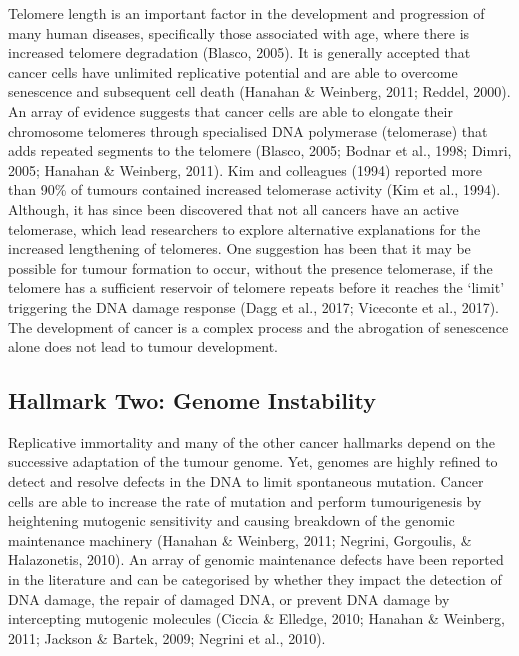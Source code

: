 \documentclass[a4paper, twoside]{templates/ociamthesis}
\begin{document}
Telomere length is an important factor in the development and progression of many human diseases, specifically those associated with age, where there is increased telomere degradation (Blasco, 2005). It is generally accepted that cancer cells have unlimited replicative potential and are able to overcome senescence and subsequent cell death (Hanahan \& Weinberg, 2011; Reddel, 2000). An array of evidence suggests that cancer cells are able to elongate their chromosome telomeres through specialised DNA polymerase (telomerase) that adds repeated segments to the telomere (Blasco, 2005; Bodnar et al., 1998; Dimri, 2005; Hanahan \& Weinberg, 2011). Kim and colleagues (1994) reported more than 90\% of tumours contained increased telomerase activity (Kim et al., 1994).
Although, it has since been discovered that not all cancers have an active telomerase, which lead researchers to explore alternative explanations for the increased lengthening of telomeres. One suggestion has been that it may be possible for tumour formation to occur, without the presence telomerase, if the telomere has a sufficient reservoir of telomere repeats before it reaches the `limit' triggering the DNA damage response (Dagg et al., 2017; Viceconte et al., 2017). The development of cancer is a complex process and the abrogation of senescence alone does not lead to tumour development.

\hypertarget{hallmark-two-genome-instability}{%
\subsection{Hallmark Two: Genome Instability}\label{hallmark-two-genome-instability}}

Replicative immortality and many of the other cancer hallmarks depend on the successive adaptation of the tumour genome. Yet, genomes are highly refined to detect and resolve defects in the DNA to limit spontaneous mutation. Cancer cells are able to increase the rate of mutation and perform tumourigenesis by heightening mutogenic sensitivity and causing breakdown of the genomic maintenance machinery (Hanahan \& Weinberg, 2011; Negrini, Gorgoulis, \& Halazonetis, 2010). An array of genomic maintenance defects have been reported in the literature and can be categorised by whether they impact the detection of DNA damage, the repair of damaged DNA, or prevent DNA damage by intercepting mutogenic molecules (Ciccia \& Elledge, 2010; Hanahan \& Weinberg, 2011; Jackson \& Bartek, 2009; Negrini et al., 2010).
\end{document}

